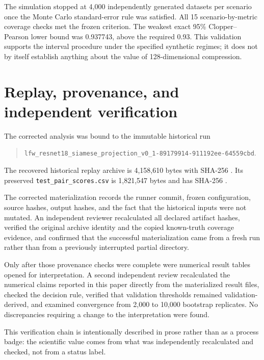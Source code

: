 \documentclass[10pt,a4paper]{article}
\newcommand{\code}[1]{\texttt{#1}}
\begin{document}
The simulation stopped at 4,000 independently generated datasets per scenario once the
Monte Carlo standard-error rule was satisfied. All 15 scenario-by-metric coverage checks met
the frozen criterion. The weakest exact 95\% Clopper--Pearson lower bound was 0.937743,
above the required 0.93. This validation supports the interval procedure under the specified
synthetic regimes; it does not by itself establish anything about the value of
128-dimensional compression.

\section{Replay, provenance, and independent verification}\label{sec:verification}

The corrected analysis was bound to the immutable historical run
\begin{quote}
\code{lfw\_resnet18\_siamese\_projection\_v0\_1-89179914-911192ee-64559cbd}.
\end{quote}
The recovered historical replay archive is 4,158,610 bytes with SHA-256
\texttt{}.
Its preserved \code{test\_pair\_scores.csv} is 1,821,547 bytes and has SHA-256
\texttt{}.

The corrected materialization records the runner commit, frozen configuration, source
hashes, output hashes, and the fact that the historical inputs were not mutated. An
independent reviewer recalculated all declared artifact hashes, verified the original
archive identity and the copied known-truth coverage evidence, and confirmed that the
successful materialization came from a fresh run rather than from a previously interrupted
partial directory.

Only after those provenance checks were complete were numerical result tables opened for
interpretation. A second independent review recalculated the numerical claims reported in
this paper directly from the materialized result files, checked the decision rule, verified
that validation thresholds remained validation-derived, and examined convergence from
2,000 to 10,000 bootstrap replicates. No discrepancies requiring a change to the
interpretation were found.

This verification chain is intentionally described in prose rather than as a process badge:
the scientific value comes from what was independently recalculated and checked, not from a
status label.
\end{document}
